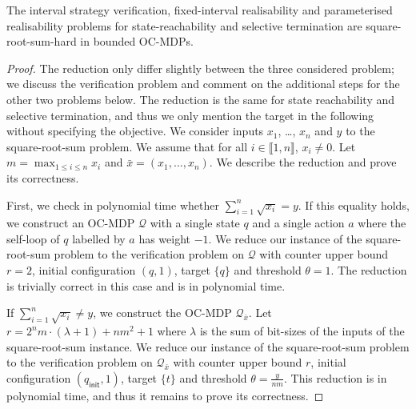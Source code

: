\documentclass[a4paper,UKenglish,cleveref,autoref,thm-restate,colorlinks]{lipics-v2021}
\newcommand{\init}{\mathsf{init}}
\newcommand{\integerInterval}[1]{\llbracket{}#1\rrbracket{}}
\newcommand{\sqsx}{x} \newcommand{\sqsxVect}{\bar{x}} \newcommand{\sqsm}{m} \newcommand{\sqsy}{y} \newcommand{\sqsi}{i} \newcommand{\sqsn}{n} \newcommand{\sqsSize}{E}
\newcommand{\ocmdp}{\mathcal{Q}}
\newcommand{\ocState}{q}
\newcommand{\ocStateC}{t}
\newcommand{\ocAction}{a}
\newcommand{\counterUB}{r}
\newcommand{\chainX}{\ocmdp_{\sqsxVect}}
\newcommand{\thresProba}{\theta}
\begin{document}
\begin{theorem}\label{verification:hardness:bounded}
  The interval strategy verification, fixed-interval realisability and parameterised realisability problems for state-reachability and selective termination are square-root-sum-hard in bounded OC-MDPs.
\end{theorem}
\begin{proof}
  The reduction only differ slightly between the three considered problem; we discuss the verification problem and comment on the additional steps for the other two problems below.
  The reduction is the same for state reachability and selective termination, and thus we only mention the target in the following without specifying the objective.
  We consider inputs $\sqsx_1$, \ldots, $\sqsx_\sqsn$ and $\sqsy$ to the square-root-sum problem.
  We assume that for all $\sqsi\in\integerInterval{1, \sqsn}$, $\sqsx_\sqsi\neq 0$.
  Let $\sqsm = \max_{1\leq\sqsi\leq\sqsn}\sqsx_\sqsi$ and $\sqsxVect = (\sqsx_1,\ldots, \sqsx_\sqsn)$.
  We describe the reduction and prove its correctness.
  
  First, we check in polynomial time whether $\sum_{\sqsi=1}^\sqsn\sqrt{\sqsx_\sqsi}=\sqsy$.
  If this equality holds, we construct an OC-MDP $\ocmdp$ with a single state $\ocState$ and a single action $\ocAction$ where the self-loop of $\ocState$ labelled by $\ocAction$ has weight $-1$.
  We reduce our instance of the square-root-sum problem to the verification problem on $\ocmdp$ with counter upper bound $\counterUB=2$, initial configuration $(\ocState, 1)$, target $\{\ocState\}$ and threshold $\thresProba=1$.
  The reduction is trivially correct in this case and is in polynomial time.

  If $\sum_{\sqsi=1}^\sqsn\sqrt{\sqsx_\sqsi}\neq\sqsy$, we construct the OC-MDP $\chainX$.
  Let $\counterUB = 2^\sqsn\sqsm\cdot(\lambda+1)+\sqsn\sqsm^2+1$ where $\lambda$ is the sum of bit-sizes of the inputs of the square-root-sum instance.
  We reduce our instance of the square-root-sum problem to the verification problem on $\chainX$ with counter upper bound $\counterUB$, initial configuration $(\ocState_\init, 1)$, target $\{\ocStateC\}$ and threshold $\thresProba = \frac{\sqsy}{\sqsn\sqsm}$.
  This reduction is in polynomial time, and thus it remains to prove its correctness.


\end{proof}
\end{document}
